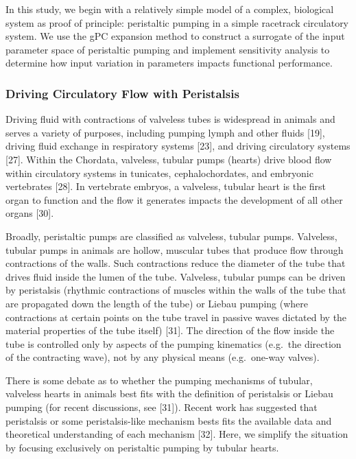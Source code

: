 \documentclass[
]{article}
\begin{document}
In this study, we begin with a relatively simple model of a complex,
biological system as proof of principle: peristaltic pumping in a simple
racetrack circulatory system. We use the gPC expansion method to
construct a surrogate of the input parameter space of peristaltic
pumping and implement sensitivity analysis to determine how input
variation in parameters impacts functional performance.

\hypertarget{driving-circulatory-flow-with-peristalsis}{%
\subsubsection{Driving Circulatory Flow with
Peristalsis}\label{driving-circulatory-flow-with-peristalsis}}

Driving fluid with contractions of valveless tubes is widespread in
animals and serves a variety of purposes, including pumping lymph and
other fluids {[}19{]}, driving fluid exchange in respiratory systems
{[}23{]}, and driving circulatory systems {[}27{]}. Within the Chordata,
valveless, tubular pumps (hearts) drive blood flow within circulatory
systems in tunicates, cephalochordates, and embryonic vertebrates
{[}28{]}. In vertebrate embryos, a valveless, tubular heart is the first
organ to function and the flow it generates impacts the development of
all other organs {[}30{]}.

Broadly, peristaltic pumps are classified as valveless, tubular pumps.
Valveless, tubular pumps in animals are hollow, muscular tubes that
produce flow through contractions of the walls. Such contractions reduce
the diameter of the tube that drives fluid inside the lumen of the tube.
Valveless, tubular pumps can be driven by peristalsis (rhythmic
contractions of muscles within the walls of the tube that are propagated
down the length of the tube) or Liebau pumping (where contractions at
certain points on the tube travel in passive waves dictated by the
material properties of the tube itself) {[}31{]}. The direction of the
flow inside the tube is controlled only by aspects of the pumping
kinematics (e.g.~the direction of the contracting wave), not by any
physical means (e.g.~one-way valves).

There is some debate as to whether the pumping mechanisms of tubular,
valveless hearts in animals best fits with the definition of peristalsis
or Liebau pumping (for recent discussions, see {[}31{]}). Recent work
has suggested that peristalsis or some peristalsis-like mechanism bests
fits the available data and theoretical understanding of each mechanism
{[}32{]}. Here, we simplify the situation by focusing exclusively on
peristaltic pumping by tubular hearts.
\end{document}

